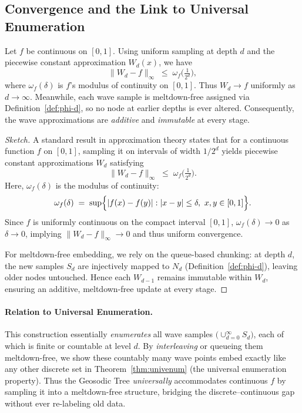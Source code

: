 \subsection{Convergence and the Link to Universal Enumeration}
\label{subsec:wave-conclusion}

\begin{theorem}
\label{thm:uniform-wave-conv}
  Let $f$ be continuous on $[0,1]$. Using uniform sampling at depth $d$
  and the piecewise constant approximation $W_d(x)$, we have
  \[
    \|W_d - f\|_\infty \;\le\; \omega_f\bigl(\tfrac{1}{2^d}\bigr),
  \]
  where $\omega_f(\delta)$ is $f$'s modulus of continuity on $[0,1]$. Thus
  $W_d \to f$ uniformly as $d\to\infty$. Meanwhile, each wave sample is
  meltdown-free assigned via Definition~\ref{def:phi-d}, so no node at earlier
  depths is ever altered. Consequently, the wave approximations are
  \emph{additive} and \emph{immutable} at every stage.
\end{theorem}

\begin{proof}[Sketch]
  A standard result in approximation theory states that for a continuous
  function $f$ on $[0,1]$, sampling it on intervals of width $1/2^d$ yields
  piecewise constant approximations $W_d$ satisfying
  \[
    \|W_d - f\|_\infty \;\le\; \omega_f\bigl(\tfrac{1}{2^d}\bigr).
  \]
  Here, $\omega_f(\delta)$ is the modulus of continuity:
  \[
    \omega_f(\delta)
    \;=\;
    \sup\Bigl\{
      |f(x)-f(y)| : |x-y|\le\delta,\ x,y\in[0,1]
    \Bigr\}.
  \]
  Since $f$ is uniformly continuous on the compact interval $[0,1]$,
  $\omega_f(\delta)\to 0$ as $\delta\to 0$, implying $\|W_d - f\|_\infty\to0$
  and thus uniform convergence. 

  For meltdown-free embedding, we rely on the queue-based chunking:
  at depth $d$, the new samples $S_d$ are injectively mapped to $N_d$
  (Definition~\ref{def:phi-d}), leaving older nodes untouched. Hence
  each $W_{d-1}$ remains immutable within $W_d$, ensuring an additive,
  meltdown-free update at every stage.
\end{proof}

\paragraph{Relation to Universal Enumeration.}
This construction essentially \emph{enumerates} all wave samples
$\bigl(\cup_{d=0}^{\infty} S_d\bigr)$, each of which is finite or countable at
level $d$. By \emph{interleaving} or queueing them meltdown-free, we show these
countably many wave points embed exactly like any other discrete set in
Theorem~\ref{thm:univenum} (the universal enumeration property). Thus the
Geosodic Tree \emph{universally} accommodates continuous $f$ by sampling it
into a meltdown-free structure, bridging the discrete--continuous gap without
ever re-labeling old data.

